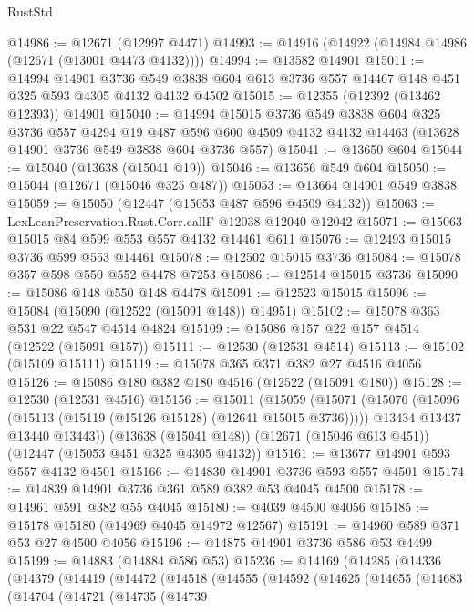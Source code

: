 \begin{lexlean}{RustStd}
\begin{coremodule}
@14986 := @12671 (@12997 @4471)
@14993 := @14916 (@14922 (@14984 @14986 (@12671 (@13001 @4473 @4132))))
@14994 := @13582 @14901
@15011 := @14994
    @14901
    @3736
    @549
    @3838
    @604
    @613
    @3736
    @557
    @14467
    @148
    @451
    @325
    @593
    @4305
    @4132
    @4132
    @4502
@15015 := @12355 (@12392 (@13462 @12393)) @14901
@15040 := @14994
    @15015
    @3736
    @549
    @3838
    @604
    @325
    @3736
    @557
    @4294
    @19
    @487
    @596
    @600
    @4509
    @4132
    @4132
    @14463
    (@13628 @14901 @3736 @549 @3838 @604 @3736 @557)
@15041 := @13650 @604
@15044 := @15040 (@13638 (@15041 @19))
@15046 := @13656 @549 @604
@15050 := @15044 (@12671 (@15046 @325 @487))
@15053 := @13664 @14901 @549 @3838
@15059 := @15050 (@12447 (@15053 @487 @596 @4509 @4132))
@15063 := LexLeanPreservation.Rust.Corr.callF @12038 @12040 @12042
@15071 := @15063 @15015 @84 @599 @553 @557 @4132 @14461 @611
@15076 := @12493 @15015 @3736 @599 @553 @14461
@15078 := @12502 @15015 @3736
@15084 := @15078 @357 @598 @550 @552 @4478 @7253
@15086 := @12514 @15015 @3736
@15090 := @15086 @148 @550 @148 @4478
@15091 := @12523 @15015
@15096 := @15084 (@15090 (@12522 (@15091 @148)) @14951)
@15102 := @15078 @363 @531 @22 @547 @4514 @4824
@15109 := @15086 @157 @22 @157 @4514 (@12522 (@15091 @157))
@15111 := @12530 (@12531 @4514)
@15113 := @15102 (@15109 @15111)
@15119 := @15078 @365 @371 @382 @27 @4516 @4056
@15126 := @15086 @180 @382 @180 @4516 (@12522 (@15091 @180))
@15128 := @12530 (@12531 @4516)
@15156 := @15011
    (@15059
      (@15071
        (@15076 (@15096 (@15113 (@15119 (@15126 @15128) (@12641 @15015 @3736)))))
        @13434
        @13437
        @13440
        @13443))
    (@13638 (@15041 @148))
    (@12671 (@15046 @613 @451))
    (@12447 (@15053 @451 @325 @4305 @4132))
@15161 := @13677 @14901 @593 @557 @4132 @4501
@15166 := @14830 @14901 @3736 @593 @557 @4501
@15174 := @14839 @14901 @3736 @361 @589 @382 @53 @4045 @4500
@15178 := @14961 @591 @382 @55 @4045
@15180 := @4039 @4500 @4056
@15185 := @15178 @15180 (@14969 @4045 @14972 @12567)
@15191 := @14960 @589 @371 @53 @27 @4500 @4056
@15196 := @14875 @14901 @3736 @586 @53 @4499
@15199 := @14883 (@14884 @586 @53)
@15236 := @14169
    (@14285
      (@14336
        (@14379
          (@14419
            (@14472
              (@14518
                (@14555
                  (@14592
                    (@14625
                      (@14655
                        (@14683
                          (@14704
                            (@14721
                              (@14735
                                (@14739

\end{coremodule}
\end{lexlean}
